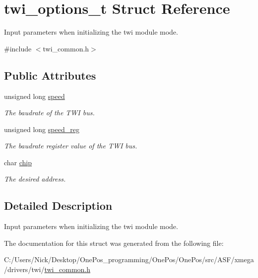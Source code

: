 \hypertarget{structtwi__options__t}{\section{twi\-\_\-options\-\_\-t Struct Reference}
\label{structtwi__options__t}
}


Input parameters when initializing the twi module mode.  




{\ttfamily \#include $<$twi\-\_\-common.\-h$>$}

\subsection*{Public Attributes}
\begin{DoxyCompactItemize}
\item 
\hypertarget{structtwi__options__t_ad81e7400d394a2f72d7ad84588d3d661}{unsigned long \hyperlink{structtwi__options__t_ad81e7400d394a2f72d7ad84588d3d661}{speed}}\label{structtwi__options__t_ad81e7400d394a2f72d7ad84588d3d661}

\begin{DoxyCompactList}\small\item\em The baudrate of the T\-W\-I bus. \end{DoxyCompactList}\item 
\hypertarget{structtwi__options__t_a5d4b427934a3cfa1c27087fad96b0e35}{unsigned long \hyperlink{structtwi__options__t_a5d4b427934a3cfa1c27087fad96b0e35}{speed\-\_\-reg}}\label{structtwi__options__t_a5d4b427934a3cfa1c27087fad96b0e35}

\begin{DoxyCompactList}\small\item\em The baudrate register value of the T\-W\-I bus. \end{DoxyCompactList}\item 
\hypertarget{structtwi__options__t_a356f838dd27b3bacac5d2220948ef5ba}{char \hyperlink{structtwi__options__t_a356f838dd27b3bacac5d2220948ef5ba}{chip}}\label{structtwi__options__t_a356f838dd27b3bacac5d2220948ef5ba}

\begin{DoxyCompactList}\small\item\em The desired address. \end{DoxyCompactList}\end{DoxyCompactItemize}


\subsection{Detailed Description}
Input parameters when initializing the twi module mode. 

The documentation for this struct was generated from the following file\-:\begin{DoxyCompactItemize}
\item 
C\-:/\-Users/\-Nick/\-Desktop/\-One\-Pos\-\_\-programming/\-One\-Pos/\-One\-Pos/src/\-A\-S\-F/xmega/drivers/twi/\hyperlink{twi__common_8h}{twi\-\_\-common.\-h}\end{DoxyCompactItemize}
